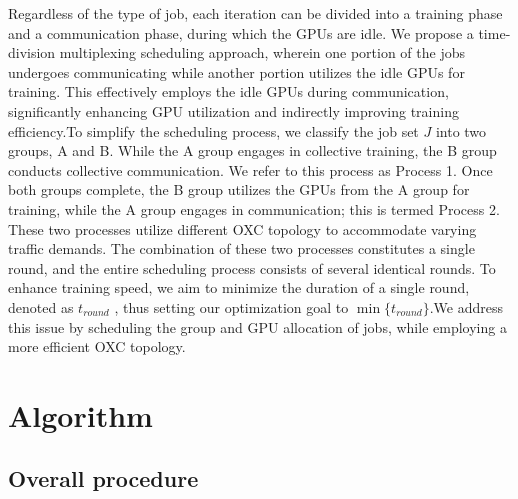 \documentclass[conference]{IEEEtran}
\begin{document}

Regardless of the type of job, each iteration can be divided into a training phase and a communication phase, during which the GPUs are idle. We propose a time-division multiplexing scheduling approach, wherein one portion of the jobs undergoes communicating while another portion utilizes the idle GPUs for training. This effectively employs the idle GPUs during communication, significantly enhancing GPU utilization and indirectly improving training efficiency.To simplify the scheduling process, we classify the job set $J$ into two groups, A and B. While the A group engages in collective training, the B group conducts collective communication. We refer to this process as Process 1. Once both groups complete, the B group utilizes the GPUs from the A group for training, while the A group engages in communication; this is termed Process 2. These two processes utilize different OXC topology to accommodate varying traffic demands. The combination of these two processes constitutes a single round, and the entire scheduling process consists of several identical rounds. To enhance training speed, we aim to minimize the duration of a single round, denoted as $t_{round}$ , thus setting our optimization goal to $\min\{t_{round}\}$.We address this issue by scheduling the group and GPU allocation of jobs, while employing a more efficient OXC topology.

\section{Algorithm}
\subsection{Overall procedure}
\end{document}
